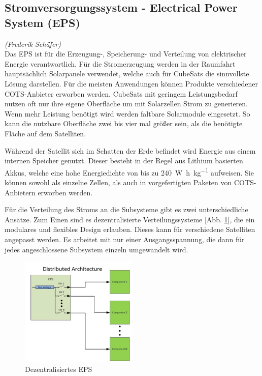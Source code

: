 		\subsection[Stromversorgungssystem]{Stromversorgungssystem - Electrical Power System (EPS)}%
\hfill\emph{(Frederik Schäfer)}\\	
		Das EPS ist für die Erzeugung-, Speicherung- und Verteilung von elektrischer Energie verantwortlich. 
Für die Stromerzeugung werden in der Raumfahrt hauptsächlich Solarpanele verwendet, welche auch für CubeSats die sinnvollste Lösung darstellen.
Für die meisten Anwendungen können Produkte verschiedener COTS-Anbieter erworben werden. CubeSats mit geringem Leistungsbedarf nutzen oft nur ihre eigene Oberfläche um mit Solarzellen Strom zu generieren. Wenn mehr Leistung benötigt wird werden faltbare Solarmodule eingesetzt. So kann die nutzbare Oberfläche zwei bis vier mal größer sein, als die benötigte Fläche auf dem Satelliten.\cite{Lettau.}

	Während der Satellit sich im Schatten der Erde befindet wird Energie aus einem internen Speicher genutzt. Dieser besteht in der Regel aus Lithium basierten Akkus, welche eine hohe Energiedichte von bis zu \SI[per-mode=symbol]{240}{\watt\hour\per\kilogram} aufweisen. Sie können sowohl als einzelne Zellen, als auch in vorgefertigten Paketen von COTS-Anbietern erworben werden.\cite{Lettau., Abaker.2017}
	


	Für die Verteilung des Stroms an die Subsysteme gibt es zwei unterschiedliche Ansätze. Zum Einen sind es dezentralisierte Verteilungssysteme [Abb. \ref{d_eps}], die ein modulares und flexibles Design erlauben. Dieses kann für verschiedene Satelliten angepasst werden. Es arbeitet mit nur einer Ausgangsspannung, die dann für jedes angeschlossene Subsystem einzeln umgewandelt wird.%
\begin{figure}[!h]
	\centering
		\includegraphics[width=0.50\textwidth]{./graphics/Distributed_EPS.PNG}
	\caption{Dezentralisiertes EPS \cite{Burt.2011}}
	\label{d_eps}
\end{figure}

